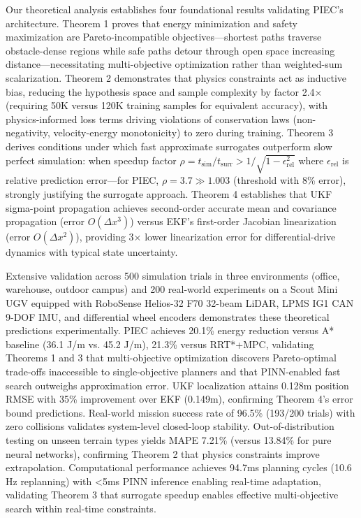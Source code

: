 \documentclass[pdflatex,sn-nature]{sn-jnl}%
\begin{document}
Our theoretical analysis establishes four foundational results validating PIEC's architecture. Theorem 1 proves that energy minimization and safety maximization are Pareto-incompatible objectives—shortest paths traverse obstacle-dense regions while safe paths detour through open space increasing distance—necessitating multi-objective optimization rather than weighted-sum scalarization. Theorem 2 demonstrates that physics constraints act as inductive bias, reducing the hypothesis space and sample complexity by factor 2.4× (requiring 50K versus 120K training samples for equivalent accuracy), with physics-informed loss terms driving violations of conservation laws (non-negativity, velocity-energy monotonicity) to zero during training. Theorem 3 derives conditions under which fast approximate surrogates outperform slow perfect simulation: when speedup factor $\rho = t_{\text{sim}}/t_{\text{surr}} > 1/\sqrt{1-\epsilon_{\text{rel}}^2}$ where $\epsilon_{\text{rel}}$ is relative prediction error—for PIEC, $\rho=3.7 \gg 1.003$ (threshold with 8\% error), strongly justifying the surrogate approach. Theorem 4 establishes that UKF sigma-point propagation achieves second-order accurate mean and covariance propagation (error $O(\Delta x^3)$) versus EKF's first-order Jacobian linearization (error $O(\Delta x^2)$), providing 3× lower linearization error for differential-drive dynamics with typical state uncertainty.

Extensive validation across 500 simulation trials in three environments (office, warehouse, outdoor campus) and 200 real-world experiments on a Scout Mini UGV equipped with RoboSense Helios-32 F70 32-beam LiDAR, LPMS IG1 CAN 9-DOF IMU, and differential wheel encoders demonstrates these theoretical predictions experimentally. PIEC achieves 20.1\% energy reduction versus A* baseline (36.1 J/m vs. 45.2 J/m), 21.3\% versus RRT*+MPC, validating Theorems 1 and 3 that multi-objective optimization discovers Pareto-optimal trade-offs inaccessible to single-objective planners and that PINN-enabled fast search outweighs approximation error. UKF localization attains 0.128m position RMSE with 35\% improvement over EKF (0.149m), confirming Theorem 4's error bound predictions. Real-world mission success rate of 96.5\% (193/200 trials) with zero collisions validates system-level closed-loop stability. Out-of-distribution testing on unseen terrain types yields MAPE 7.21\% (versus 13.84\% for pure neural networks), confirming Theorem 2 that physics constraints improve extrapolation. Computational performance achieves 94.7ms planning cycles (10.6 Hz replanning) with <5ms PINN inference enabling real-time adaptation, validating Theorem 3 that surrogate speedup enables effective multi-objective search within real-time constraints.
\end{document}
